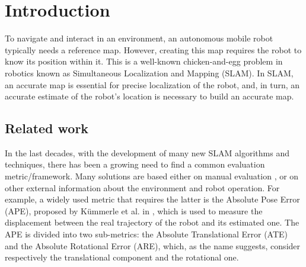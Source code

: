 
\section{Introduction} %
To navigate and interact in an environment, an autonomous mobile robot typically needs a reference map. However, creating this map requires the robot to know its position within it. This is a well-known chicken-and-egg problem in robotics known as Simultaneous Localization and Mapping (SLAM). In SLAM, an accurate map is essential for precise localization of the robot, and, in turn, an accurate estimate of the robot's location is necessary to build an accurate map.


\subsection{Related work}\label{sec:related} %
In the last decades, with the development of many new SLAM algorithms and techniques, there has been a growing need to find a common evaluation metric/framework. Many solutions are based either on manual evaluation \cite{balaguer2007visualEval}, or on other external information about the environment and robot operation. For example, a widely used metric that requires the latter is the Absolute Pose Error (APE), proposed by Kümmerle et al. in \cite{kummerle2009ATE}, which is used to measure the displacement between the real trajectory of the robot and its estimated one. The APE is divided into two sub-metrics: the Absolute Translational Error (ATE) and the Absolute Rotational Error (ARE), which, as the name suggests, consider respectively the translational component and the rotational one.

